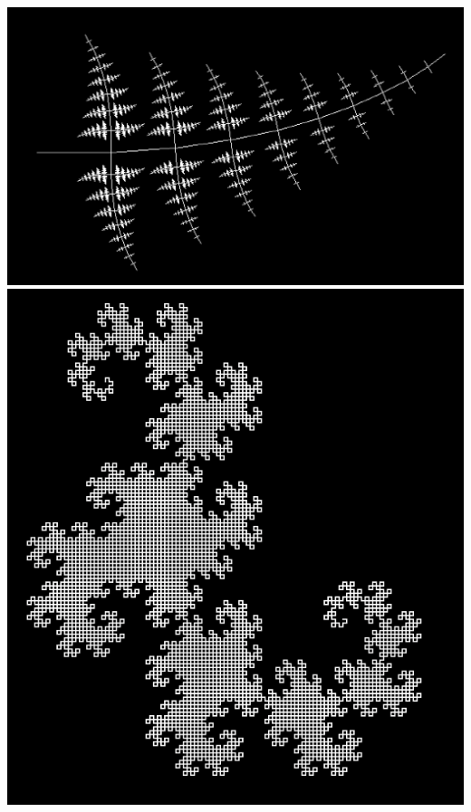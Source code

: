 \documentclass{article}
\begin{document}
\includegraphics[width=\textwidth]{pictures/fern.png}
\includegraphics[width=\textwidth]{pictures/dragon.png}
\end{document}

